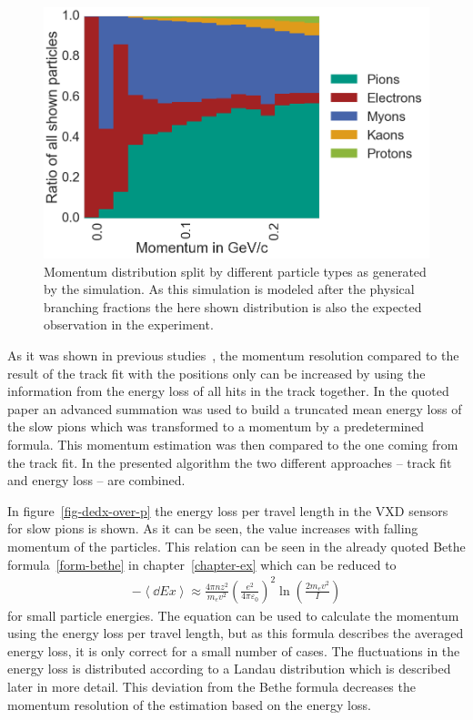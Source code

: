 \begin{figure}
 \centering
 \includegraphics[width=0.7\linewidth]{figures/vxd/momentumDistribution.png}
 \caption[Momentum distribution by different particle types.]{Momentum distribution split by different particle types as generated by the simulation. As this simulation is modeled after the physical branching fractions the here shown distribution is also the expected observation in the experiment.}
 \label{fig-particles-momentum}
\end{figure}

As it was shown in previous studies~\cite{robert}, the momentum resolution compared to the result of the track fit with the positions only can be increased by using the information from the energy loss of all hits in the track together. In the quoted paper an advanced summation was used to build a truncated mean energy loss of the slow pions which was transformed to a momentum by a predetermined formula. This momentum estimation was then compared to the one coming from the track fit. In the presented algorithm the two different approaches -- track fit and energy loss -- are combined.

In figure~\ref{fig-dedx-over-p} the energy loss per travel length in the VXD sensors for slow pions is shown. As it can be seen, the \dedx value increases with falling momentum of the particles. This relation can be seen in the already quoted Bethe formula~\ref{form-bethe} in chapter~\ref{chapter-ex} which can be reduced to 
\begin{align}
 -\left \langle \dd{E}{x} \right\rangle \approx \frac{4 \pi n z^2}{m_e v^2} \left( \frac{e^2}{4 \pi \varepsilon_0} \right)^2 \ln \left( \frac{2 m_e v^2}{I} \right) \label{form-bethe-simpl}
\end{align}
for small particle energies. The equation can be used to calculate the momentum using the energy loss per travel length, but as this formula describes the averaged energy loss, it is only correct for a small number of cases. The fluctuations in the energy loss is distributed according to a Landau distribution which is described later in more detail. This deviation from the Bethe formula decreases the momentum resolution of the estimation based on the energy loss.

